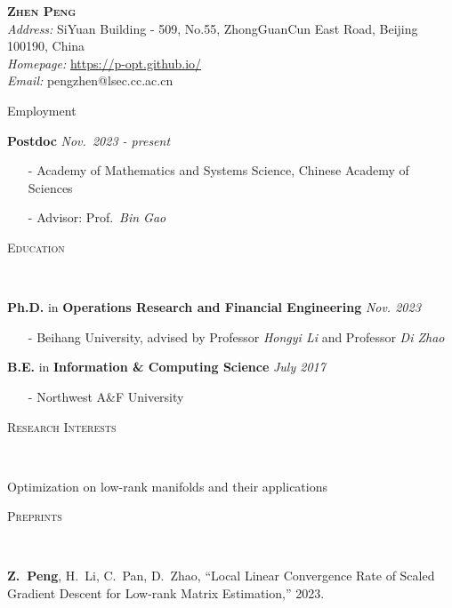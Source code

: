 \documentclass[a4paper, 10pt]{article}
\newenvironment{changemargin}[2]{%
  \begin{list}{}{%
    \setlength{\topsep}{0pt}%
    \setlength{\leftmargin}{#1}%
    \setlength{\rightmargin}{#2}%
    \setlength{\listparindent}{\parindent}%
    \setlength{\itemindent}{\parindent}%
    \setlength{\parsep}{\parskip}%
  }%
  \item[]}{\end{list}
}
\newcommand{\lineover}{
	\begin{changemargin}{-0.05in}{-0.05in}
		\vspace*{-8pt}
		\hrulefill \\
		\vspace*{-2pt}
	\end{changemargin}
}
\newcommand{\header}[1]{
	\begin{changemargin}{-0.5in}{-0.5in}
		\scshape{#1}\\
  	\lineover
	\end{changemargin}
}
\newcommand{\contact}[5]{
	\begin{changemargin}{-0.5in}{-0.5in}
		\begin{center}
			{\Large \scshape {#1}}\\ \smallskip
			{#2}\\ \smallskip
			{#3}\\ \smallskip
			{#4}\\ \smallskip
			{#5}\smallskip
		\end{center}
	\end{changemargin}
}
\newenvironment{body} {
	\vspace*{-16pt}
	\begin{changemargin}{-0.3in}{-0.5in}
  }	
	{\end{changemargin}
}
\begin{document}
\contact{\bf{Zhen Peng}
\vspace{6pt}}{\emph{Address: } SiYuan Building - 509, No.55, ZhongGuanCun East Road, Beijing 100190, China}{\emph{Homepage:} \url{https://p-opt.github.io/}}{\emph{Email:} pengzhen@lsec.cc.ac.cn}

\header{\LARGE{Employment}}
\begin{body}
	\vspace{18pt}
	\textbf{Postdoc}
	\hfill \emph{Nov.~2023 - present} \\
	\begin{itemize}
		\item[-] Academy of Mathematics and Systems Science, Chinese Academy of Sciences
		\item[-] Advisor: Prof.~\emph{Bin Gao}
	\end{itemize}
\end{body}

\bigskip
\header{\LARGE{Education}}
\begin{body}
	\vspace{18pt}

	\textbf{Ph.D.} in \textbf{Operations Research and Financial Engineering} \hfill \emph{Nov. 2023}
    \begin{itemize}
      \item[-] Beihang University, advised by Professor \emph{Hongyi Li} and Professor \emph{Di Zhao}
    \end{itemize}
    \textbf{B.E.} in \textbf{Information \& Computing Science } \hfill \emph{July 2017} \\
    \begin{itemize}
      \item[-] Northwest A\&F University
    \end{itemize}
\end{body}

\bigskip
\header{\LARGE{Research Interests}}
\begin{body}
\vspace{18pt}
Optimization on low-rank manifolds and their applications
\end{body}

\bigskip
\header{\LARGE{Preprints}}
\begin{body}
	\vspace{18pt}
	\begin{enumerate}[label={[{P}{{\arabic*}}]}]

\item \textbf{Z.~Peng}, H.~Li, C.~Pan, D.~Zhao, {``Local Linear Convergence Rate of Scaled Gradient Descent for Low-rank Matrix Estimation,''} 2023.\\

	\end{enumerate}
\end{body}
\end{document}
